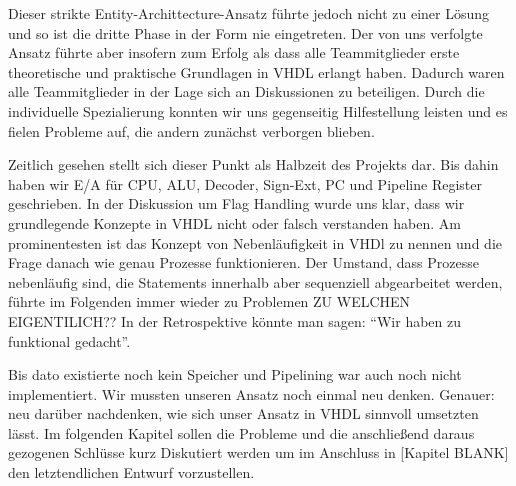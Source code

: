 \documentclass[paper=a4,fontsize=12pt,twocolumn]{scrreprt}
\begin{document}
%
%

Dieser strikte Entity-Archittecture-Ansatz führte jedoch nicht zu einer Lösung und so ist die dritte Phase in der Form nie eingetreten.
Der von uns verfolgte Ansatz führte aber insofern zum Erfolg als dass alle Teammitglieder erste theoretische und praktische Grundlagen in VHDL erlangt haben.
Dadurch waren alle Teammitglieder in der Lage sich an Diskussionen zu beteiligen.
Durch die individuelle Spezialierung konnten wir uns gegenseitig Hilfestellung leisten und es fielen Probleme auf, die andern zunächst verborgen blieben.

Zeitlich gesehen stellt sich dieser Punkt als Halbzeit des Projekts dar.
Bis dahin haben wir E/A für CPU, ALU, Decoder, Sign-Ext, PC und Pipeline Register geschrieben.
In der Diskussion um Flag Handling wurde uns klar, dass wir grundlegende Konzepte in VHDL nicht oder falsch verstanden haben.
Am prominentesten ist das Konzept von Nebenläufigkeit in VHDl zu nennen und die Frage danach wie genau Prozesse funktionieren.
Der Umstand, dass Prozesse nebenläufig sind, die Statements innerhalb aber sequenziell abgearbeitet werden, führte im Folgenden immer wieder zu Problemen {\color{red}ZU WELCHEN EIGENTILICH??}
In der Retrospektive könnte man sagen: \enquote{Wir haben zu funktional gedacht}.





Bis dato existierte noch kein Speicher und Pipelining war auch noch nicht implementiert.
Wir mussten unseren Ansatz noch einmal neu denken. Genauer: neu darüber nachdenken, wie sich unser Ansatz in VHDL sinnvoll umsetzten lässt.
Im folgenden Kapitel sollen die Probleme und die anschließend daraus gezogenen Schlüsse kurz Diskutiert werden um im Anschluss in [Kapitel BLANK] den letztendlichen Entwurf vorzustellen. 
\end{document}

